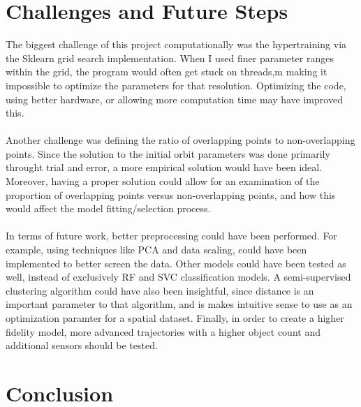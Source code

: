 \documentclass[./report_entry.tex]{subfiles}
\begin{document}
    \section*{Challenges and Future Steps}
        \noindent The biggest challenge of this project computationally was the hypertraining via the Sklearn grid search
        implementation.  When I used finer parameter ranges within the grid, the program would often get stuck on threads,m
        making it impossible to optimize the parameters for that resolution.  Optimizing the code, using better hardware, or allowing more 
        computation time may have improved this.
        \\ \\
        \noindent  Another challenge was defining the ratio of overlapping points to non-overlapping points.
        Since the solution to the initial orbit parameters was done primarily throught trial and error, a more empirical solution
        would have been ideal.  Moreover, having a proper solution could allow for an examination of the proportion of overlapping points versus
        non-overlapping points, and how this would affect the model fitting/selection process.
        \\ \\
        \noindent In terms of future work, better preprocessing could have been performed.  For example, using techniques like PCA and data scaling, could have been
        implemented to better screen the data.  Other models could have been tested as well, instead of exclusively RF and SVC classification
        models.  A semi-supervised clustering algorithm could have also been insightful, since distance is an important parameter to that algorithm,
        and is makes intuitive sense to use as an optimization paramter for a spatial dataset.  Finally, in order to create a higher fidelity model, more advanced trajectories with a 
        higher object count and additional sensors should be tested.
    \section*{Conclusion}
\end{document}
